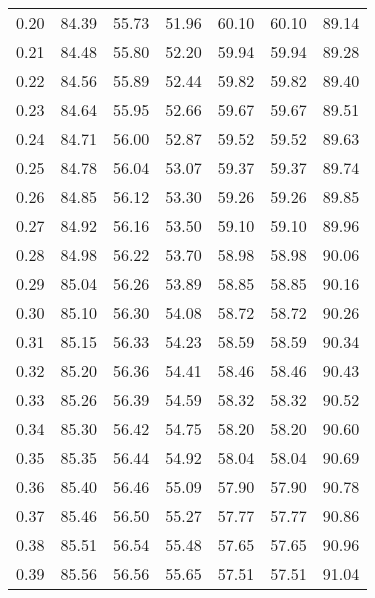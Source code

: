 \begin{tabular}{|c|c|c|c|c|c|c|}
      0.20 &     84.39 &     55.73 &      51.96 &   60.10 &      60.10 &         89.14 \\
      0.21 &     84.48 &     55.80 &      52.20 &   59.94 &      59.94 &         89.28 \\
      0.22 &     84.56 &     55.89 &      52.44 &   59.82 &      59.82 &         89.40 \\
      0.23 &     84.64 &     55.95 &      52.66 &   59.67 &      59.67 &         89.51 \\
      0.24 &     84.71 &     56.00 &      52.87 &   59.52 &      59.52 &         89.63 \\
      0.25 &     84.78 &     56.04 &      53.07 &   59.37 &      59.37 &         89.74 \\
      0.26 &     84.85 &     56.12 &      53.30 &   59.26 &      59.26 &         89.85 \\
      0.27 &     84.92 &     56.16 &      53.50 &   59.10 &      59.10 &         89.96 \\
      0.28 &     84.98 &     56.22 &      53.70 &   58.98 &      58.98 &         90.06 \\
      0.29 &     85.04 &     56.26 &      53.89 &   58.85 &      58.85 &         90.16 \\
      0.30 &     85.10 &     56.30 &      54.08 &   58.72 &      58.72 &         90.26 \\
      0.31 &     85.15 &     56.33 &      54.23 &   58.59 &      58.59 &         90.34 \\
      0.32 &     85.20 &     56.36 &      54.41 &   58.46 &      58.46 &         90.43 \\
      0.33 &     85.26 &     56.39 &      54.59 &   58.32 &      58.32 &         90.52 \\
      0.34 &     85.30 &     56.42 &      54.75 &   58.20 &      58.20 &         90.60 \\
      0.35 &     85.35 &     56.44 &      54.92 &   58.04 &      58.04 &         90.69 \\
      0.36 &     85.40 &     56.46 &      55.09 &   57.90 &      57.90 &         90.78 \\
      0.37 &     85.46 &     56.50 &      55.27 &   57.77 &      57.77 &         90.86 \\
      0.38 &     85.51 &     56.54 &      55.48 &   57.65 &      57.65 &         90.96 \\
      0.39 &     85.56 &     56.56 &      55.65 &   57.51 &      57.51 &         91.04 \\

\end{tabular}
